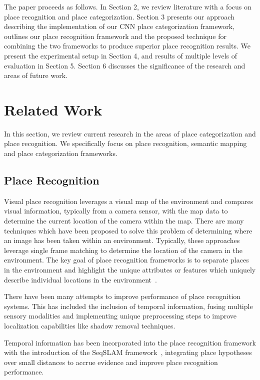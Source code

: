 \documentclass[letterpaper, 10 pt, conference]{ieeeconf}  %
\begin{document}
The paper proceeds as follows. In Section 2, we review literature with a focus on place recognition and place categorization. Section 3 presents our approach describing the implementation of our CNN place categorization framework, outlines our place recognition framework and the proposed technique for combining the two frameworks to produce superior place recognition results. We present the experimental setup in Section 4, and results of multiple levels of evaluation in Section 5. Section 6 discusses the significance of the research and areas of future work.

\section{Related Work}
In this section, we review current research in the areas of place categorization and place recognition. We specifically focus on place recognition, semantic mapping and place categorization frameworks. 

\subsection{Place Recognition}
Visual place recognition leverages a visual map of the environment and compares visual information, typically from a camera sensor, with the map data to determine the current location of the camera within the map. There are many techniques which have been proposed to solve this problem of determining where an image has been taken within an environment. Typically, these approaches leverage single frame matching to determine the location of the camera in the environment. The key goal of place recognition frameworks is to separate places in the environment and highlight the unique attributes or features which uniquely describe individual locations in the environment~\cite{Cummins2009,nister2006scalable}. 

There have been many attempts to improve performance of place recognition systems. This has included the inclusion of temporal information, fusing multiple sensory modalities and implementing unique preprocessing steps to improve localization capabilities like shadow removal techniques. 

Temporal information has been incorporated into the place recognition framework with the introduction of the SeqSLAM framework~\cite{Milford2012}, integrating place hypotheses over small distances to accrue evidence and improve place recognition performance.
\end{document}
